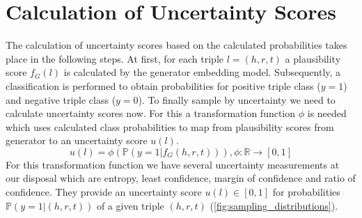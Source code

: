 \section{Calculation of Uncertainty Scores}
\label{sec:calculation_of_uncertainty_scores}


The calculation of uncertainty scores based on the calculated probabilities takes place in the following steps.
At first, for each triple $l= (h, r, t)$ a plausibility score $f_G(l)$ is calculated by the generator embedding model. 
Subsequently, a classification is performed to obtain probabilities for positive triple class ($y = 1$) and negative triple class ($y = 0$).
To finally sample by uncertainty we need to calculate uncertainty scores now. 
For this a transformation function $\phi$ is needed which uses calculated class probabilities to map from plausibility scores from generator to an uncertainty score $u(l)$.
\begin{equation} \label{eqn:uncertainty_function}
    u(l) = \phi(\mathds{P}(y = 1| f_G(h, r, t))), \phi: \mathbb{R} \rightarrow [0,1]
\end{equation}
For this transformation function we have several uncertainty measurements at our disposal which are entropy, least confidence, margin of confidence and ratio of confidence.
They provide an uncertainty score $u(l) \in [0, 1]$ for probabilities $\mathbb{P}(y = 1 | (h,r,t))$ of a given triple $(h, r, t)$ (\autoref{fig:sampling_distributions}).
